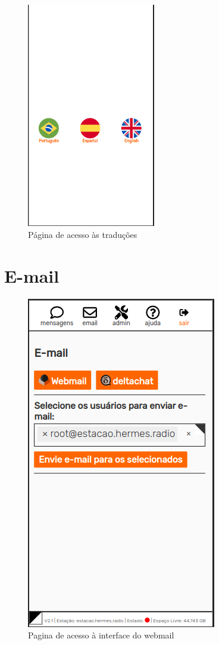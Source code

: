 \documentclass[11pt,a4paper]{article}
\begin{document}
\begin{figure}[H]
    \centering
    \includegraphics[width=0.5\textwidth]{screenshots/frontend/pt_kn/languages2.png}
    \caption{Página de acesso às traduções}
	\vspace{-10pt}
    \label{fig:languages2}
\end{figure}

\section{E-mail}
\label{email}

\begin{figure}[H]
    \centering
    \includegraphics[width=0.5\columnwidth]{screenshots/frontend/pt_kn/email.png}
    	\caption{Pagina de acesso à interface do webmail}
	\vspace{-10pt}
    \label{fig:webmail2}
\end{figure}
\end{document}
